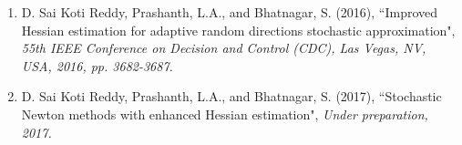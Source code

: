 \begin{enumerate}
\item D. Sai Koti Reddy, Prashanth, L.A., and  Bhatnagar, S. (2016), ``Improved Hessian estimation for adaptive random directions stochastic approximation", {\em 55th IEEE  Conference on Decision and Control (CDC), Las Vegas, NV, USA, 2016, pp. 3682-3687.} \\
\item D. Sai Koti Reddy, Prashanth, L.A., and  Bhatnagar, S. (2017), ``Stochastic Newton methods with enhanced Hessian estimation", {\em Under preparation, 2017.} \\ \\

\end{enumerate}
